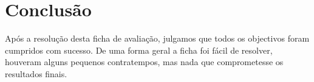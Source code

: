 \documentclass[a4paper,11pt,openright,openbib]{article}
\begin{document}


\section{Conclusão}
Após a resolução desta ficha de avaliação, julgamos que todos os objectivos foram cumpridos com sucesso. De uma forma geral a ficha foi fácil de resolver, houveram alguns pequenos contratempos, mas nada que comprometesse os resultados finais. 
\end{document}
